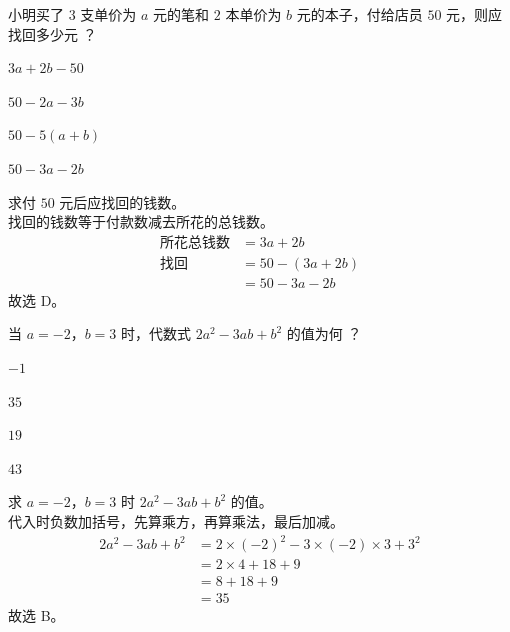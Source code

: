 \documentclass[12pt,a4paper,fontset=none]{exam-zh}
\begin{document}
\begin{question}
    小明买了 $3$ 支单价为 $a$ 元的笔和 $2$ 本单价为 $b$ 元的本子，付给店员 $50$ 元，则应找回多少元 \paren[D]？
    \begin{choices}
        \item $3a+2b-50$
        \item $50-2a-3b$
        \item $50-5(a+b)$
        \item $50-3a-2b$
    \end{choices}
\end{question}

\begin{solution}
    求付 $50$ 元后应找回的钱数。 \\
    找回的钱数等于付款数减去所花的总钱数。
    \begin{align*}
        \text{所花总钱数} &= 3a+2b \\
        \text{找回} &= 50-(3a+2b) \\
        &= 50-3a-2b
    \end{align*}
    故选 D。
\end{solution}

\begin{question}
    当 $a=-2$，$b=3$ 时，代数式 $2a^2-3ab+b^2$ 的值为何 \paren[B]？
    \begin{choices}
        \item $-1$
        \item $35$
        \item $19$
        \item $43$
    \end{choices}
\end{question}

\begin{solution}
    求 $a=-2$，$b=3$ 时 $2a^2-3ab+b^2$ 的值。 \\
    代入时负数加括号，先算乘方，再算乘法，最后加减。
    \begin{align*}
        2a^2-3ab+b^2 &= 2\times(-2)^2-3\times(-2)\times 3+3^2 \\
        &= 2\times 4+18+9 \\
        &= 8+18+9 \\
        &= 35
    \end{align*}
    故选 B。
\end{solution}
\end{document}
